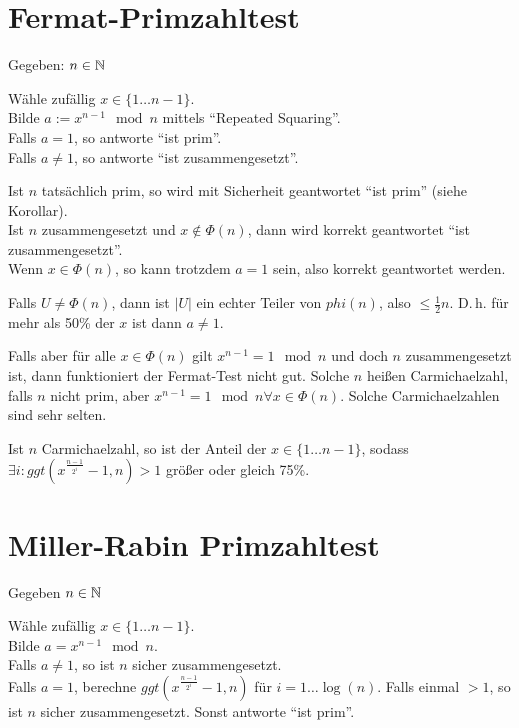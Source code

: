 \section{Fermat-Primzahltest}

Gegeben: $n \in \mathbb{N}$

Wähle zufällig $x \in \{1 \dots n-1\}$.
\\
Bilde $a := x^{n-1} \mod n$ mittels ``Repeated Squaring''.
\\
Falls $a = 1$, so antworte ``ist prim''.
\\
Falls $a \neq 1$, so antworte ``ist zusammengesetzt''.

Ist $n$ tatsächlich prim, so wird mit Sicherheit geantwortet ``ist prim'' (siehe Korollar).
\\
Ist $n$ zusammengesetzt und $x \notin \Phi(n)$, dann wird korrekt geantwortet ``ist zusammengesetzt''.
\\
Wenn $x \in \Phi(n)$, so kann trotzdem $a = 1$ sein, also korrekt geantwortet werden.

Falls $U \neq \Phi(n)$, dann ist $|U|$ ein echter Teiler von $phi(n)$, also $\leq \frac{1}{2} n$.
D.\,h. für mehr als 50\% der $x$ ist dann $a \neq 1$.

Falls aber für alle $x \in \Phi(n)$ gilt $x^{n-1} = 1 \mod n$ und doch $n$ zusammengesetzt ist, dann funktioniert der Fermat-Test nicht gut. Solche $n$ heißen Carmichaelzahl, falls $n$ nicht prim, aber $x^{n-1} = 1 \mod n \forall x \in \Phi(n)$. Solche Carmichaelzahlen sind sehr selten.



\begin{satz}

    Ist $n$ Carmichaelzahl, so ist der Anteil der $x \in \{1 \dots n-1\}$, sodass $\exists i: ggt(x^{\frac{n-1}{2^i}} - 1, n) > 1$ größer oder gleich 75\%.

\end{satz}



\section{Miller-Rabin Primzahltest}

Gegeben $n \in \mathbb{N}$

Wähle zufällig $x \in \{1 \dots n-1\}$.
\\
Bilde $a = x^{n-1} \mod n$.
\\
Falls $a \neq 1$, so ist $n$ sicher zusammengesetzt.
\\
Falls $a = 1$, berechne $ggt(x^{\frac{n-1}{2^i}} - 1, n)$ für $i = 1 \dots \log(n)$. Falls einmal $> 1$, so ist $n$ sicher zusammengesetzt. Sonst antworte ``ist prim''.

